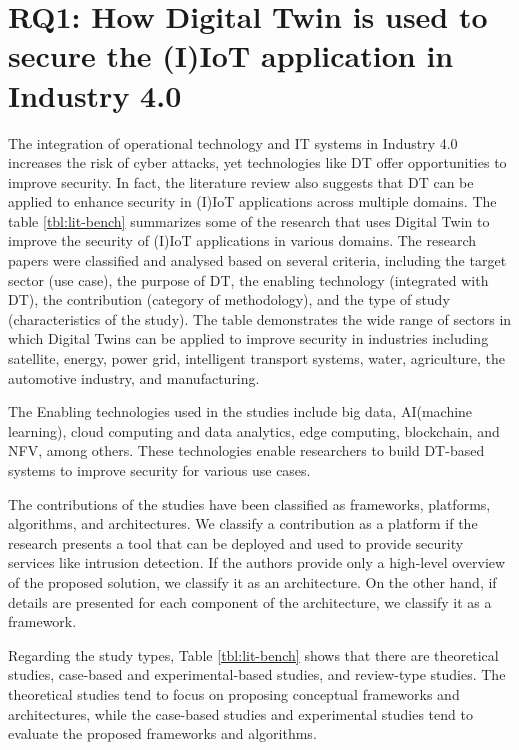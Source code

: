 %
%
\section{RQ1: How Digital Twin is used to secure the (I)IoT application in Industry 4.0}

The integration of operational technology and IT systems in Industry 4.0 increases the risk of cyber attacks, yet technologies like DT offer opportunities to improve security\cite{dietzHarnessingDigitalTwin2022}. In fact, the literature review also suggests that DT can be applied to enhance security in (I)IoT applications across multiple domains. The table \ref{tbl:lit-bench} summarizes some of the research that uses Digital Twin to improve the security of (I)IoT applications in various domains. The research papers were classified and analysed based on several criteria, including the target sector (use case), the purpose of DT, the enabling technology (integrated with DT), the contribution (category of methodology), and the type of study (characteristics of the study). The table demonstrates the wide range of sectors in which Digital Twins can be applied to improve security in industries including satellite, energy, power grid, intelligent transport systems, water, agriculture, the automotive industry, and manufacturing.

The Enabling technologies used in the studies include big data,  AI(machine learning), cloud computing and data analytics, edge computing, blockchain, and NFV, among others. These technologies enable researchers to build DT-based systems to improve security for various use cases.

The contributions of the studies have been classified as frameworks, platforms, algorithms, and architectures. We classify a contribution as a platform if the research presents a tool that can be deployed and used to provide security services like intrusion detection. If the authors provide only a high-level overview of the proposed solution, we classify it as an architecture. On the other hand, if details are presented for each component of the architecture, we classify it as a framework.

Regarding the study types, Table \ref{tbl:lit-bench} shows that there are theoretical studies, case-based and experimental-based studies, and review-type studies. The theoretical studies tend to focus on proposing conceptual frameworks and architectures, while the case-based studies and experimental studies tend to evaluate the proposed frameworks and algorithms. 


